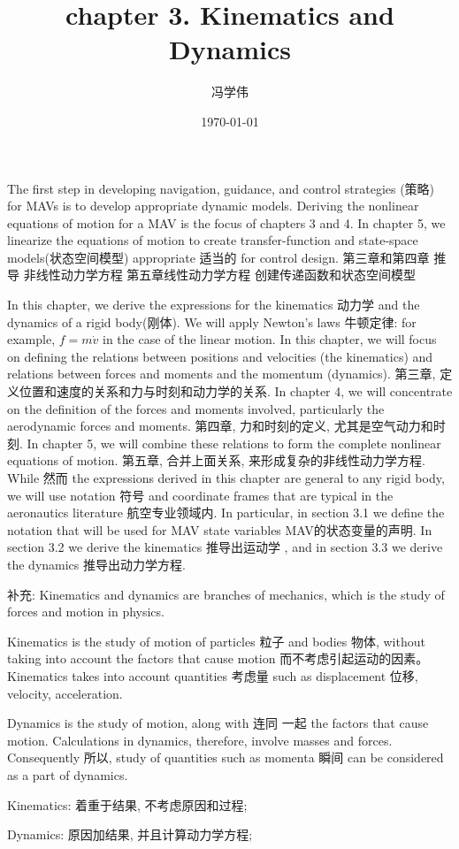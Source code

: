 \documentclass[UTF8,a4paper,10pt,nocolorlinks]{ctexart}
\title{chapter 3. Kinematics and Dynamics}
\author{冯学伟}
\date{\today}
\begin{document}
    \maketitle
		The first step in developing navigation, guidance, and control strategies (策略) for MAVs is to develop appropriate dynamic models. Deriving the nonlinear equations of motion for a MAV is the focus of chapters 3 and 4. In chapter 5, we linearize the equations of motion to create transfer-function and state-space models(状态空间模型) appropriate 适当的 for control design. 
    第三章和第四章 推导 非线性动力学方程
第五章线性动力学方程 创建传递函数和状态空间模型 \par
	In this chapter, we derive the expressions for the kinematics 动力学 and the dynamics of a rigid body(刚体). We will apply Newton’s laws 牛顿定律: for example,
$f = m \dot{v}$ in the case of the linear motion. In this chapter, we will focus on defining the relations between positions and velocities (the kinematics) and relations between forces and moments and the momentum (dynamics). 
第三章, 定义位置和速度的关系和力与时刻和动力学的关系. 
In chapter 4, we will concentrate on the definition of the
forces and moments involved, particularly the aerodynamic forces and moments. 
第四章, 力和时刻的定义, 尤其是空气动力和时刻. 
In chapter 5, we will combine these relations to form the complete nonlinear equations of motion. 
第五章, 合并上面关系, 来形成复杂的非线性动力学方程. 
While 然而 the expressions derived in this chapter are general to any rigid body, we will use notation 符号 and coordinate frames that are typical in the aeronautics literature 航空专业领域内. In
particular, in section 3.1 we define the notation that will be used for MAV state variables MAV的状态变量的声明. In section 3.2 we derive the kinematics 推导出运动学 , and in
section 3.3 we derive the dynamics 推导出动力学方程.
\par 补充: 
Kinematics and dynamics are branches of mechanics, which is the study of forces and motion in physics.\par
Kinematics is the study of motion of particles 粒子 and bodies 物体, without taking into account the factors that cause motion 而不考虑引起运动的因素。Kinematics takes into account quantities 考虑量 such as displacement 位移, velocity, acceleration.\par
Dynamics is the study of motion, along with 连同 一起  the factors that cause motion. Calculations in dynamics, therefore, involve masses and forces. Consequently 所以, study of quantities such as momenta 瞬间 can be considered as a part of dynamics.\par
Kinematics: 	着重于结果, 不考虑原因和过程; \par
Dynamics: 		原因加结果, 并且计算动力学方程;
\par
\end{document}
